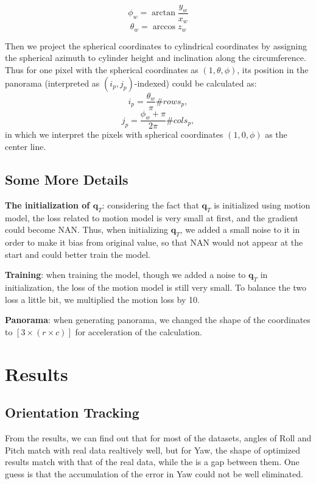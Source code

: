 \documentclass[conference]{IEEEtran}
\begin{document}
\begin{equation}
    \phi_w = \arctan\frac{y_w}{x_w}
\end{equation}
\begin{equation}
    \theta_w = \arccos z_w
\end{equation}

Then we project the spherical coordinates to cylindrical coordinates by assigning the spherical azimuth to cylinder height
and inclination along the circumference. Thus for one pixel with the spherical coordinates as $(1, \theta, \phi)$, its position
in the panorama (interpreted as $(i_p, j_p)$-indexed) could be calculated as:
\begin{equation}
    i_p = \frac{\theta_w}{\pi} \#rows_p,
\end{equation}
\begin{equation}
    j_p = \frac{\phi_w + \pi}{2\pi} \#cols_p,
\end{equation}
in which we interpret the pixels with spherical coordinates $(1, 0, \phi)$ as the center line.

\subsection{Some More Details}
\textbf{The initialization of $\boldsymbol{q}_T$}: considering the fact that $\boldsymbol{q}_T$ is initialized using
motion model, the loss related to motion model is very small at first, and the gradient could become NAN. Thus, when
initializing $\boldsymbol{q}_T$, we added a small noise to it in order to make it bias from original value, so that
NAN would not appear at the start and could better train the model.

\textbf{Training}: when training the model, though we added a noise to $\boldsymbol{q}_T$ in initialization, the loss of
the motion model is still very small. To balance the two loss a little bit, we multiplied the motion loss by 10.

\textbf{Panorama}: when generating panorama, we changed the shape of the coordinates to $[3 \times (r \times c)]$ for
acceleration of the calculation.


\section{Results}
\subsection{Orientation Tracking}
From the results, we can find out that for most of the datasets, angles of Roll and Pitch match with real data realtively
well, but for Yaw, the shape of optimized results match with that of the real data, while the is a gap between them. One
guess is that the accumulation of the error in Yaw could not be well eliminated.
\end{document}
